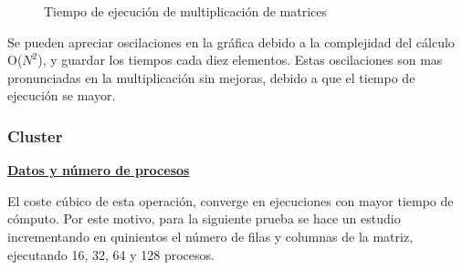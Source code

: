 		\begin{figure}[!h]
		\centering
		\caption{Tiempo de ejecución de multiplicación de matrices}
		\end{figure}
		
		Se pueden apreciar oscilaciones en la gráfica debido a la complejidad del cálculo O($N^{2}$), y guardar los tiempos cada diez elementos. Estas oscilaciones son mas pronunciadas en la multiplicación sin mejoras, debido a que el tiempo de ejecución se mayor.
		\newpage
		
		\subsubsection{Cluster}
		
			\begin{flushleft}
			\begin{mdframed}[roundcorner=5pt]			
				\textbf{\underline{Datos y número de procesos}}
				\vspace{0.1cm}
				
				\scriptsize	
				El coste cúbico de esta operación, converge en ejecuciones con mayor tiempo de cómputo. Por este motivo, para la siguiente prueba se hace un estudio incrementando en quinientos el número de filas y columnas de la matriz, ejecutando 16, 32, 64 y 128 procesos.				
			\end{mdframed}
			\end{flushleft}	


